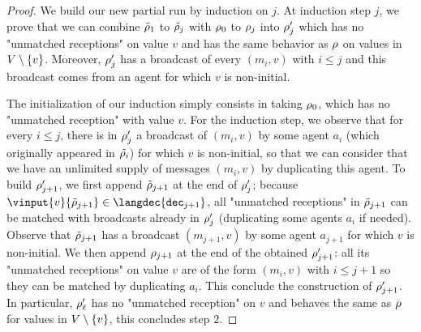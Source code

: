 \begin{proof}

We build our new partial run by induction on $j$. At induction step $j$, we prove that we can combine $\Tilde{\rho}_1$ to $\Tilde{\rho}_j$ with $\rho_0$ to $\rho_j$ into $\rho_j'$ which has no "unmatched receptions" on value $v$ and has the same behavior as $\rho$ on values in $V \setminus \{v\}$. Moreover, $\rho_j'$ has a broadcast of every $(m_i,v)$ with $i \leq j$ and this broadcast comes from an agent for which $v$ is non-initial. 

The initialization of our induction simply consists in taking $\rho_0$, which has no "unmatched reception" with value $v$. For the induction step, we observe that for every $i \leq j$, there is in $\rho_j'$ a broadcast of $(m_i,v)$ by some agent $a_i$ (which originally appeared in $\Tilde{\rho_i}$) for which $v$ is non-initial, so that we can consider that we have an unlimited supply of messages $(m_i,v)$ by duplicating this agent. 
To build $\rho_{j+1}'$, we first append $\Tilde{\rho}_{j+1}$ at the end of $\rho_j'$; because $\vinput{v}{\Tilde{\run}_{j+1}} \in \langdec{\decsymb_{j+1}}$, all "unmatched receptions" in $\Tilde{\rho}_{j+1}$ can be matched with broadcasts already in $\rho_j'$ (duplicating some agents $a_i$ if needed). Observe that $\Tilde{\rho}_{j+1}$ has a broadcast  $(m_{j+1},v)$ by some agent $a_{j+1}$ for which $v$ is non-initial. We then append $\rho_{j+1}$ at the end of the obtained $\rho_{j+1}'$: all its "unmatched receptions" on value $v$ are of the form $(m_i,v)$ with $i \leq j+1$ so they can be matched by duplicating $a_i$. This conclude the construction of $\rho_{j+1}'$. In particular, $\rho_{\ell}'$ has no "unmatched reception" on $v$ and behaves the same as $\rho$ for values in $V \setminus \{v\}$, this concludes step $2$.



\end{proof}
